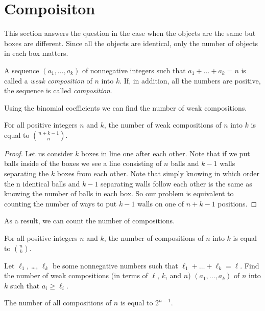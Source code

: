 \section{Compoisiton}
This section answers the question in the case when the objects
are the same but boxes are different. Since all the objects
are identical, only the number of objects in each box matters.

\begin{definition}
  A sequence $(a_1, \dots, a_k)$ of nonnegative integers such
  that $a_1 + \dots + a_k = n$ is called a \emph{weak composition}
  of $n$ into $k$. If, in addition, all the numbers are positive,
  the sequence is called \emph{composition}.
\end{definition}

Using the binomial coefficients we can find the number of weak
compositions.
\begin{theorem}
  For all positive integers $n$ and $k$,
  the number of weak compositions of $n$ into $k$ is equal to
  $\binom{n + k - 1}{n}$.
\end{theorem}
\begin{proof}
  Let us consider $k$ boxes in line one after each other. Note that if we
  put balls inside of the boxes we see a line consisting of $n$ balls and
  $k - 1$ walls separating the $k$ boxes from each other. Note that simply
  knowing in which order the n identical balls and $k - 1$ separating walls
  follow each other is the same as knowing the number of balls in each box.
  So our problem is equivalent to counting the number of ways to put $k - 1$
  walls on one of $n + k - 1$ positions.
\end{proof}

As a result, we can count the number of compositions.
\begin{corollary}
  For all positive integers $n$ and $k$,
  the number of compositions of $n$ into $k$ is equal to
  $\binom{n}{k}$.
\end{corollary}

\begin{exercise}
  Let $\ell_1$, \dots, $\ell_k$ be some nonnegative numbers
  such that $\ell_1 + \dots + \ell_k = \ell$.
  Find the number of weak compositions (in terms of $\ell$, $k$, and $n$)
  $(a_1, \dots, a_k)$ of $n$ into $k$ such that $a_i \ge \ell_i$.
\end{exercise}

\begin{corollary}
  The number of all compositions of $n$ is equal to $2^{n - 1}$.
\end{corollary}

